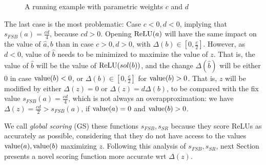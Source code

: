 \begin{figure}[t!]
	\caption{A running example with parametric weights {\color{red}$c$} and {\color{red}$d$}}
	\label{img:FSB_example}
\end{figure}



The last case is the most problematic: 
Case $c<0,d<0$, implying that $s_{FSB}(a)=\frac{cd}{4}$, because $cd >0$.
Opening $\mathrm{ReLU}(a)$ will have the same impact on the value of $\hat{a},b$ 
than in case $c>0,d>0$, with $\Delta(b) \in [0,\frac{c}{2}]$.
However, as $d<0$, value of $\hat{b}$ needs to be minimized to maximize the value of $z$. That is, the value of $\hat{b}$ will be the value of $\mathrm{ReLU}(sol(b))$, and the change 
$\Delta(\hat{b})$ will be either 0 in case ${\textrm{value}}(b)<0$,
or $\Delta(b) \in [0,\frac{c}{2}]$ for ${\textrm{value}}(b)>0$.
That is, $z$ will be modified by either $\Delta(z)=0$ or $\Delta(z) = d \Delta(b)$, to be compared with the fix value $s_{FSB}(a)=\frac{cd}{4}$, which is not always an overapproximation: we have $\Delta(z)=\frac{cd}{2} > s_{FSB}(a)$, 
if ${\textrm{value}}(a)=0$ and ${\textrm{value}}(b)>0$.

We call {\em global scoring} (GS) these functions $s_{FSB},s_{SR}$  because they score ReLUs as {accurately} as possible, considering that they do not have access to the values 
${\textrm{value}}(a),{\textrm{value}}(b)$ maximizing $z$. Following this analysis of $s_{FSB},s_{SR}$, 
next Section presents a novel scoring function more accurate wrt $\Delta(z)$.
	

